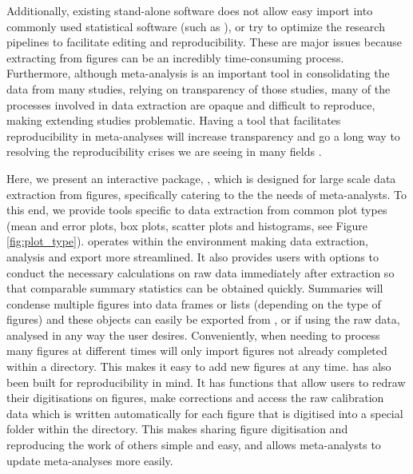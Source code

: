\documentclass[article]{jss}
\begin{document}
Additionally, existing stand-alone software does not allow easy import into commonly used statistical software (such as ), or try to optimize the research pipelines to facilitate editing and reproducibility. These are major issues because extracting from figures can be an incredibly time-consuming process. Furthermore, although meta-analysis is an important tool in consolidating the data from many studies, relying on transparency of those studies, many of the processes involved in data extraction are opaque and difficult to reproduce, making extending studies problematic. Having a tool that facilitates reproducibility in meta-analyses will increase transparency and go a long way to resolving the reproducibility crises we are seeing in many fields \citep{peng_reproducible_2006, peng_reproducible_2011, sandve_ten_2013}.

Here, we present an interactive  package, , which is designed for large scale data extraction from figures, specifically catering to the the needs of meta-analysts. To this end, we provide tools specific to data extraction from common plot types (mean and error plots, box plots, scatter plots and histograms, see Figure \ref{fig:plot_type}).  operates within the  environment making data extraction, analysis and export more streamlined. 
It also provides users with options to conduct the necessary calculations on raw data immediately after extraction so that comparable summary statistics can be obtained quickly. Summaries will condense multiple figures into data frames or lists (depending on the type of figures) and these objects can easily be exported from , or if using the raw data, analysed in any way the user desires. Conveniently, when needing to process many figures at different times  will only import figures not already completed within a directory. This makes it easy to add new figures at any time.  has also been built for reproducibility in mind. It has functions that allow users to redraw their digitisations on figures, make corrections and access the raw calibration data which is written automatically for each figure that is digitised into a special folder within the directory. This makes sharing figure digitisation and reproducing the work of others simple and easy, and allows meta-analysts to update meta-analyses more easily.
\end{document}
